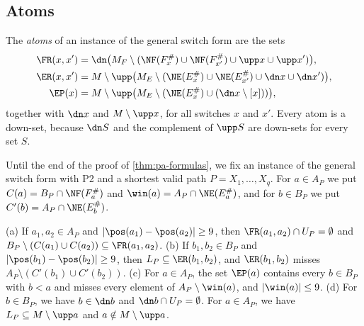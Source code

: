 \subsection{Atoms}
\label{sec:pa-atoms}

\begin{definition}[Atoms]
\label{def:pa-atoms}
The \emph{atoms} of an instance of the general switch form are the sets
\begin{align*}
\FR(x, x') &= \dn \bigl(M_F \setminus (\NF(F^\#_x) \cup \NF(F^\#_{x'}) \cup \upp x \cup \upp x')\bigr),\\
\ER(x, x') &= M \setminus \upp \bigl(M_E \setminus (\NE(E^\#_x) \cup \NE(E^\#_{x'}) \cup \dn x \cup \dn x')\bigr),\\
\EP(x) &= M \setminus \upp \bigl(M_E \setminus (\NE(E^\#_x) \cup (\dn x \setminus [x]))\bigr),
\end{align*}
together with $\dn x$ and $M \setminus \upp x$, for all switches $x$ and $x'$.
Every atom is a down-set, because $\dn S$ and the complement of $\upp S$ are down-sets for every set $S$.
\end{definition}

Until the end of the proof of \cref{thm:pa-formulas}, we fix an instance of the general switch form with P2 and a shortest valid path $P = X_1, \dots, X_q$.
For $a \in A_P$ we put $C(a) = B_P \cap \NF(F^\#_a)$ and $\win(a) = A_P \cap \NE(E^\#_a)$, and for $b \in B_P$ we put $C'(b) = A_P \cap \NE(E^\#_b)$.

\begin{lemma}[Atoms]
\label{lem:pa-atoms}
(a) If $a_1, a_2 \in A_P$ and $|\pos(a_1) - \pos(a_2)| \geq 9$, then $\FR(a_1, a_2) \cap U_P = \emptyset$ and $B_P \setminus (C(a_1) \cup C(a_2)) \subseteq \FR(a_1, a_2)$.
(b) If $b_1, b_2 \in B_P$ and $|\pos(b_1) - \pos(b_2)| \geq 9$, then $L_P \subseteq \ER(b_1, b_2)$, and $\ER(b_1, b_2)$ misses $A_P \setminus (C'(b_1) \cup C'(b_2))$.
(c) For $a \in A_P$, the set $\EP(a)$ contains every $b \in B_P$ with $b < a$ and misses every element of $A_P \setminus \win(a)$, and $|\win(a)| \leq 9$.
(d) For $b \in B_P$, we have $b \in \dn b$ and $\dn b \cap U_P = \emptyset$.
For $a \in A_P$, we have $L_P \subseteq M \setminus \upp a$ and $a \notin M \setminus \upp a$.
\end{lemma}

